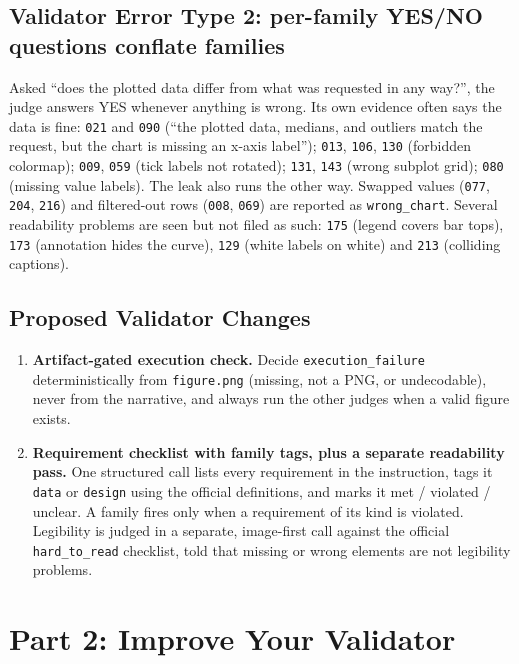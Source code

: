 \documentclass[11pt]{article}
\newcommand{\run}[1]{\texttt{#1}}
\begin{document}
\subsection{Validator Error Type 2: per-family YES/NO questions conflate families}
Asked ``does the plotted data differ from what was requested in any way?'', the
judge answers YES whenever anything is wrong. Its own evidence often says the
data is fine:
\run{021} and \run{090} (``the plotted data, medians, and outliers match the
request, but the chart is missing an x-axis label''); \run{013}, \run{106},
\run{130} (forbidden colormap); \run{009}, \run{059} (tick labels not rotated);
\run{131}, \run{143} (wrong subplot grid); \run{080} (missing value labels). The
leak also runs the other way. Swapped values (\run{077}, \run{204}, \run{216}) and
filtered-out rows (\run{008}, \run{069}) are reported as \texttt{wrong\_chart}.
Several readability problems are seen but not filed as such: \run{175} (legend
covers bar tops), \run{173} (annotation hides the curve), \run{129} (white labels
on white) and \run{213} (colliding captions).

\subsection{Proposed Validator Changes}
\begin{enumerate}
\item \textbf{Artifact-gated execution check.} Decide
\texttt{execution\_failure} deterministically from \texttt{figure.png}
(missing, not a PNG, or undecodable), never from the narrative, and always run
the other judges when a valid figure exists.
\item \textbf{Requirement checklist with family tags, plus a separate
readability pass.} One structured call lists every requirement in the
instruction, tags it \texttt{data} or \texttt{design} using the official
definitions, and marks it met / violated / unclear. A family fires only when a
requirement of its kind is violated. Legibility is judged in a separate,
image-first call against the official \texttt{hard\_to\_read} checklist, told
that missing or wrong elements are not legibility problems.
\end{enumerate}

\section{Part 2: Improve Your Validator}
\end{document}
